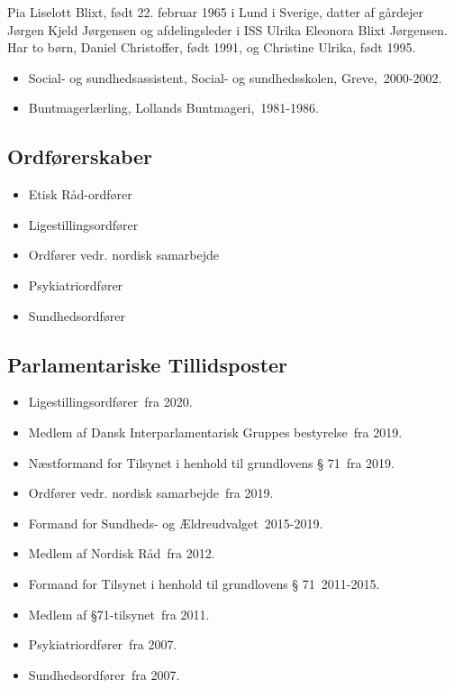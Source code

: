 \documentclass[11pt, a4paper]{awesome-cv}
\begin{document}
\makecvheader[R]
\makelettertitle
\begin{cvletter}
Pia Liselott Blixt, født 22. februar 1965 i Lund i Sverige, datter af gårdejer Jørgen Kjeld Jørgensen og afdelingsleder i ISS Ulrika Eleonora Blixt Jørgensen. Har to børn, Daniel Christoffer, født 1991, og Christine Ulrika, født 1995.

\begin{itemize}
\item Social- og sundhedsassistent, Social- og sundhedsskolen, Greve, 2000-2002.
\item Buntmagerlærling, Lollands Buntmageri, 1981-1986.
\end{itemize}
\subsection*{Ordførerskaber}
\begin{itemize}
\item Etisk Råd-ordfører
\item Ligestillingsordfører
\item Ordfører vedr. nordisk samarbejde
\item Psykiatriordfører
\item Sundhedsordfører
\end{itemize}
\subsection*{Parlamentariske Tillidsposter}
\begin{itemize}
\item Ligestillingsordfører fra 2020.
\item Medlem af Dansk Interparlamentarisk Gruppes bestyrelse fra 2019.
\item Næstformand for Tilsynet i henhold til grundlovens § 71 fra 2019.
\item Ordfører vedr. nordisk samarbejde fra 2019.
\item Formand for Sundheds- og Ældreudvalget 2015-2019.
\item Medlem af Nordisk Råd fra 2012.
\item Formand for Tilsynet i henhold til grundlovens § 71 2011-2015.
\item Medlem af §71-tilsynet fra 2011.
\item Psykiatriordfører fra 2007.
\item Sundhedsordfører fra 2007.
\end{itemize}

\end{cvletter}
\end{document}

